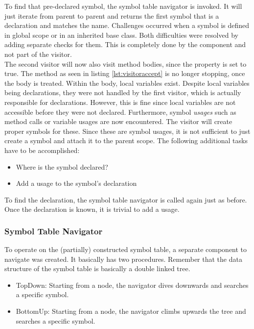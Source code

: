 To find that pre-declared symbol, the symbol table navigator is invoked.
It will just iterate from parent to parent and returns the first symbol that is a declaration and matches the name.
Challenges occurred when a symbol is defined in global scope or in an inherited base class.
Both difficulties were resolved by adding separate checks for them.
This is completely done by the  component and not part of the visitor.\\

The second visitor will now also visit method bodies, since the  property is set to true.
The  method as seen in listing \ref{lst:visitoraccept} is no longer stopping, once the body is treated.
Within the body, local variables exist.
Despite local variables being declarations, they were not handled by the first visitor, which is actually responsible for declarations.
However, this is fine since local variables are not accessible before they were not declared.
Furthermore, symbol \textit{usages} such as method calls or variable usages are now encountered.
The visitor will create proper symbols for these.
Since these are symbol usages, it is not sufficient to just create a symbol and attach it to the parent scope.
The following additional tasks have to be accomplished:
\begin{itemize}
    \item Where is the symbol declared?
    \item Add a usage to the symbol's declaration
\end{itemize}

To find the declaration, the symbol table navigator is called again just as before.
Once the declaration is known, it is trivial to add a usage.

\subsubsection{Symbol Table Navigator}
To operate on the (partially) constructed symbol table, a separate component to navigate was created.
It basically has two procedures.
Remember that the data structure of the symbol table is basically a double linked tree.

\begin{itemize}
\item TopDown: Starting from a node, the navigator dives downwards and searches a specific symbol.
\item BottomUp: Starting from a node, the navigator climbs upwards the tree and searches a specific symbol.
\end{itemize}

